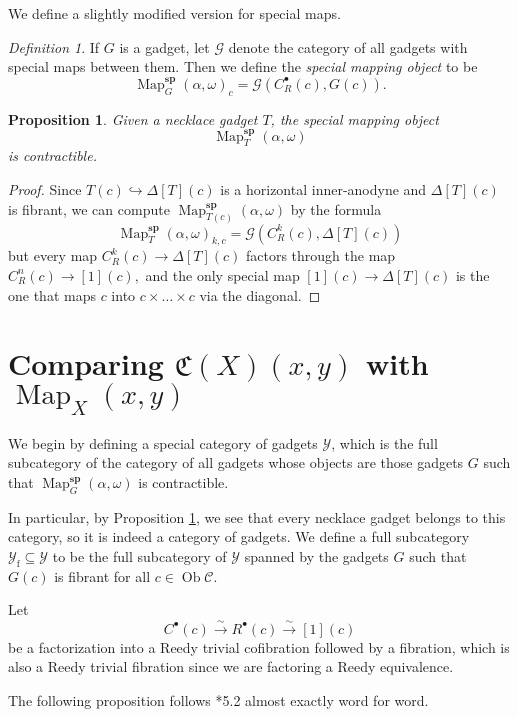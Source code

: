 \documentclass{amsart}
\numberwithin{equation}{section}
\theoremstyle{plain}   %
\newtheorem{prop}[subsection]{Proposition}
\theoremstyle{remark}
\newtheorem{defn}[subsection]{Definition}
\theoremstyle{plain}
\DeclareMathOperator{\Ob}{Ob}
\DeclareMathOperator{\Map}{Map}
\newcommand{\C}{\ensuremath{\mathcal{C}}}
\begin{document}
We define a slightly modified version for special maps.

\begin{defn}
	If \(G\) is a gadget, let \(\mathcal{G}\) denote the category of all gadgets with special maps between them.  Then we define the \emph{special mapping object} to be \[\Map^\mathbf{sp}_G(\alpha,\omega)_c=\mathcal{G}(C^\bullet_R(c),G(c)).\]
\end{defn}

\begin{prop}\label{goodgadgets}
	Given a necklace gadget \(T\), the special mapping object \[\Map^\mathbf{sp}_T(\alpha,\omega)\] is contractible.
\end{prop}
\begin{proof}
	Since \(T(c)\hookrightarrow \Delta[T](c)\) is a horizontal inner-anodyne and \(\Delta[T](c)\) is fibrant, we can compute \(\Map^\mathbf{sp}_{T(c)}(\alpha,\omega)\) by the formula 
	\[\Map^\mathbf{sp}_T(\alpha,\omega)_{k,c} = \mathcal{G}(C_R^k(c),\Delta[T](c))\]
	but every map \(C^k_R(c)\to \Delta[T](c)\) factors through the map \(C^n_R(c)\to [1](c),\) and the only special map \([1](c)\to \Delta[T](c)\) is the one that maps \(c\) into \(c\times \dots \times c\) via the diagonal.
\end{proof}

\section{Comparing \(\mathfrak{C}(X)(x,y)\) with \(\Map_X(x,y)\)}

We begin by defining a special category of gadgets \(\mathcal{Y}\), which is the full subcategory of the category of all gadgets whose objects are those gadgets \(G\) such that \(\Map^\mathbf{sp}_G(\alpha,\omega)\) is contractible.

In particular, by Proposition \ref{goodgadgets}, we see that every necklace gadget belongs to this category, so it is indeed a category of gadgets.  We define a full subcategory \(\mathcal{Y}_{\mathrm{f}}\subseteq \mathcal{Y}\) to be the full subcategory of \(\mathcal{Y}\) spanned by the gadgets \(G\) such that \(G(c)\) is fibrant for all \(c\in \Ob \C\).

Let
\[C^\bullet(c) \xrightarrow{\sim} R^\bullet(c)\xrightarrow{\sim} [1](c)\]
be a factorization into a Reedy trivial cofibration followed by a fibration, which is also a Reedy trivial fibration since we are factoring a Reedy equivalence.

The following proposition follows \cite{ds2}*{5.2} almost exactly word for word.
\end{document}
